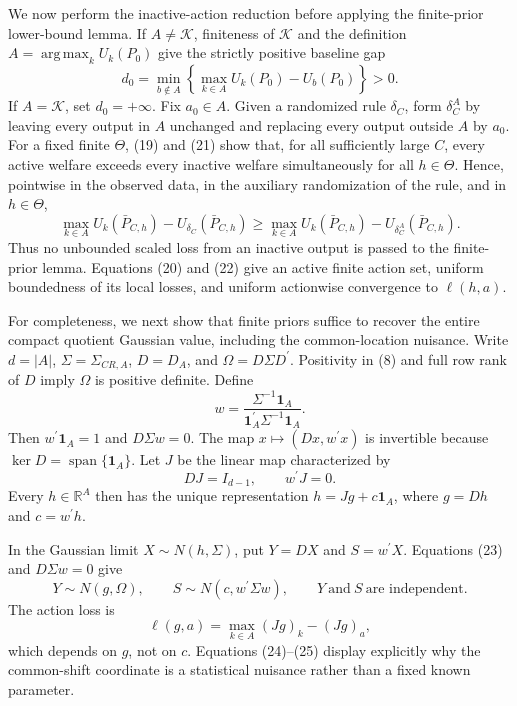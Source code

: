 We now perform the inactive-action reduction before applying the finite-prior lower-bound lemma.  If \(A\ne\mathcal K\), finiteness of \(\mathcal K\) and the definition \(A=\operatorname*{arg\,max}_kU_k(P_0)\) give the strictly positive baseline gap
\[
 d_0=\min_{b\notin A}\left\{
        \max_{k\in A}U_k(P_0)-U_b(P_0)\right\}>0.               \tag{21}
\]
If \(A=\mathcal K\), set \(d_0=+\infty\).  Fix \(a_0\in A\).  Given a randomized rule \(\delta_C\), form \(\delta_C^A\) by leaving every output in \(A\) unchanged and replacing every output outside \(A\) by \(a_0\).  For a fixed finite \(\Theta\), (19) and (21) show that, for all sufficiently large \(C\), every active welfare exceeds every inactive welfare simultaneously for all \(h\in\Theta\).  Hence, pointwise in the observed data, in the auxiliary randomization of the rule, and in \(h\in\Theta\),
\[
 \max_{k\in A}U_k(\bar P_{C,h})-U_{\delta_C}(\bar P_{C,h})
 \geq
 \max_{k\in A}U_k(\bar P_{C,h})-U_{\delta_C^A}(\bar P_{C,h}).   \tag{22}
\]
Thus no unbounded scaled loss from an inactive output is passed to the finite-prior lemma.  Equations (20) and (22) give an active finite action set, uniform boundedness of its local losses, and uniform actionwise convergence to \(\ell(h,a)\).

For completeness, we next show that finite priors suffice to recover the entire compact quotient Gaussian value, including the common-location nuisance.  Write \(d=|A|\), \(\Sigma=\Sigma_{CR,A}\), \(D=D_A\), and \(\Omega=D\Sigma D^{\prime}\).  Positivity in (8) and full row rank of \(D\) imply \(\Omega\) is positive definite.  Define
\[
 w=\frac{\Sigma^{-1}\mathbf1_A}
         {\mathbf1_A^{\prime}\Sigma^{-1}\mathbf1_A}.
\]
Then \(w^{\prime}\mathbf1_A=1\) and \(D\Sigma w=0\).  The map
\(x\mapsto(Dx,w^{\prime}x)\) is invertible because \(\ker D=\operatorname{span}\{\mathbf1_A\}\).  Let \(J\) be the linear map characterized by
\[
 DJ=I_{d-1},\qquad w^{\prime}J=0.                                \tag{23}
\]
Every \(h\in\mathbb R^A\) then has the unique representation
\(h=Jg+c\mathbf1_A\), where \(g=Dh\) and \(c=w^{\prime}h\).

In the Gaussian limit \(X\sim N(h,\Sigma)\), put \(Y=DX\) and \(S=w^{\prime}X\).  Equations (23) and \(D\Sigma w=0\) give
\[
 Y\sim N(g,\Omega),\qquad
 S\sim N\!\left(c,w^{\prime}\Sigma w\right),
 \qquad Y\ \text{and}\ S\ \text{are independent}.            \tag{24}
\]
The action loss is
\[
 \ell(g,a)=\max_{k\in A}(Jg)_k-(Jg)_a,                          \tag{25}
\]
which depends on \(g\), not on \(c\).  Equations (24)--(25) display explicitly why the common-shift coordinate is a statistical nuisance rather than a fixed known parameter.

